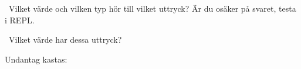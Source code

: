 \QUESTBEGIN

\Task \what~Vilket värde och vilken typ hör till vilket uttryck?  Är du osäker på svaret, testa i REPL.

\begin{ConceptConnections}[0.3\textwidth]

\end{ConceptConnections}

\SOLUTION

\TaskSolved \what

\begin{ConceptConnections}[0.3\textwidth]

\end{ConceptConnections}

\QUESTEND






\QUESTBEGIN

\Task \what~Vilket värde har dessa uttryck?  %

\Subtask {}

\Subtask {}

\Subtask {}

\Subtask {}


\Subtask {}

\Subtask {}

\Subtask {}


\Subtask {}

\Subtask {}

\Subtask {}

\SOLUTION

\TaskSolved \what

\SubtaskSolved {}

\SubtaskSolved {}

\SubtaskSolved {}

\SubtaskSolved {}


\SubtaskSolved {}

\SubtaskSolved {}

\SubtaskSolved {}


\SubtaskSolved {}

\SubtaskSolved Undantag kastas: 

